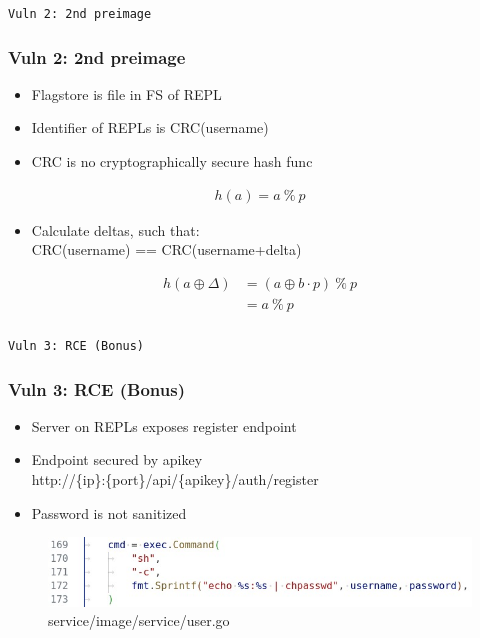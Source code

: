 \documentclass[10pt]{beamer}
\begin{document}
\begin{frame}
	\begin{center}
		\LARGE{\texttt{Vuln 2: 2nd preimage}}
	\end{center}
\end{frame}

\begin{frame}
	\frametitle{Vuln 2: 2nd preimage}
	\begin{itemize}
		\item<1-> Flagstore is file in FS of REPL
		\item<2-> Identifier of REPLs is CRC(username)
		\item<3-> CRC is no cryptographically secure hash func
	\end{itemize}
	\pause
	\pause
	\begin{align*}
		h(a) = a\ \%\ p
	\end{align*}
	\begin{itemize}
		\item<4-> Calculate deltas, such that: \\
		      CRC(username) == CRC(username+delta) \\
	\end{itemize}
	\pause
	\pause
	\begin{align*}
		h(a\oplus\Delta) & =(a\oplus b\cdot p)\ \%\ p \\
		                 & =a\ \%\ p                  \\
	\end{align*}
\end{frame}

\begin{frame}
	\begin{center}
		\LARGE{\texttt{Vuln 3: RCE (Bonus)}}
	\end{center}
\end{frame}

\begin{frame}
	\frametitle{Vuln 3: RCE (Bonus)}
	\begin{itemize}
		\item<1-> Server on REPLs exposes register endpoint
		\item<2-> Endpoint secured by apikey \\
		      http://\{ip\}:\{port\}/api/\{apikey\}/auth/register
		\item<3-> Password is not sanitized
	\end{itemize}
	\pause
	\pause
	\pause
	\begin{figure}
		\includegraphics[scale=.4]{register}
		\caption{service/image/service/user.go}
	\end{figure}
\end{frame}
\end{document}
